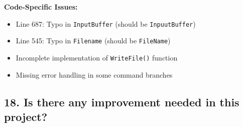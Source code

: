 \documentclass[11pt,a4paper]{article}
\begin{document}
\textbf{Code-Specific Issues:}
\begin{itemize}
    \item Line 687: Typo in \texttt{InputBuffer} (should be \texttt{InpuutBuffer})
    \item Line 545: Typo in \texttt{Filename} (should be \texttt{FileName})
    \item Incomplete implementation of \texttt{WriteFile()} function
    \item Missing error handling in some command branches
\end{itemize}

\subsection{18. Is there any improvement needed in this project?}
\end{document}
